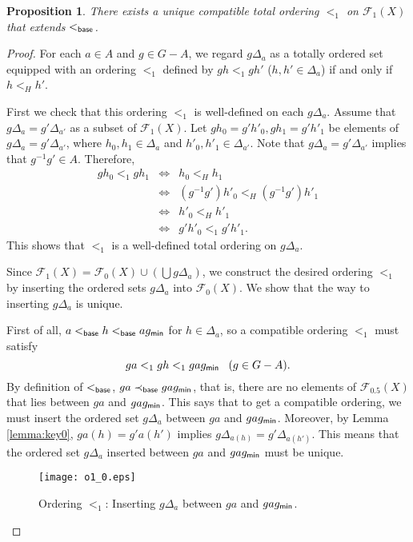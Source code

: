 \documentclass[10pt]{amsart}
\newtheorem{proposition}[theorem]{Proposition}
\numberwithin{equation}{section}
\begin{document}
\begin{proposition}
\label{prop:extbto1}
There exists a unique compatible total ordering $<_{1}$ on ${\mathcal{F}}_{1}(X)$ that extends $<_{\sf base}$.
\end{proposition}
\begin{proof}

For each $a \in A$ and $g\in G-A$, we regard $g\Delta_{a}$ as a totally ordered set equipped with an ordering $<_{1}$ defined by $gh <_{1} gh'$ ($h,h' \in \Delta_{a}$) if and only if $h <_{H} h'$. 

First we check that this ordering $<_{1}$ is well-defined on each $g\Delta_{a}$.  Assume that $g\Delta_{a} = g' \Delta_{a'}$ as a subset of ${\mathcal{F}}_{1}(X)$. Let $gh_{0}= g'h'_{0}, gh_{1}=g'h'_{1}$ be elements of $g\Delta_{a} = g' \Delta_{a'}$, where $h_{0},h_{1} \in \Delta_{a}$ and $h'_{0}, h'_{1} \in \Delta_{a'}$.
Note that $g\Delta_{a} = g' \Delta_{a'}$ implies that $g^{-1}g' \in A$. Therefore, 
\begin{eqnarray*}
gh_{0}<_{1} gh_{1} & \iff & h_{0}<_{H} h_{1} \\
& \iff & (g^{-1}g')h'_{0} <_{H} (g^{-1}g')h'_{1} \\
& \iff & h'_{0} <_{H} h'_{1}\\
& \iff & g'h'_{0} <_{1} g'h'_{1}.
\end{eqnarray*}
This shows that $<_{1}$ is a well-defined total ordering on $g\Delta_{a}$.

Since ${\mathcal{F}}_{1}(X) = {\mathcal{F}}_{0}(X) \cup \left(\bigcup g \Delta_{a} \right)$, we construct the desired ordering $<_{1}$ by inserting the ordered sets $g\Delta_{a}$ into ${\mathcal{F}}_{0}(X)$. We show that the way to inserting $g\Delta_{a}$ is unique. 

First of all, $a <_{\sf base} h <_{\sf base} ag_{\sf min}$ for $h \in \Delta_{a}$, so a compatible ordering $<_{1}$ must satisfy 
\[ ga <_{1} gh <_{1} gag_{\sf min}  \;\;\; (g \in G-A).\]
By definition of $<_{\sf base}$, $ga \prec_{\sf base} gag_{\sf min}$, that is, there are no elements of ${\mathcal{F}}_{0.5}(X)$ that lies between $ga$ and $gag_{\sf min}$.
This says that to get a compatible ordering, we must insert the ordered set $g\Delta_{a}$ between $ga$ and $gag_{\sf min}$. Moreover, by Lemma \ref{lemma:key0}, $ga(h) = g'a(h')$ implies $g \Delta_{a(h)}=g'\Delta_{a(h')}$. This means that the ordered set $g\Delta_a$ inserted between $ga$ and $gag_{\sf min}$ must be unique.

\begin{figure}[htbp]
 \begin{center}
\texttt{[image: o1\_0.eps]}
\caption{Ordering $<_{1}$: Inserting $g\Delta_{a}$ between $ga$ and $gag_{\sf min}$.}
\label{fig:o1}
\end{center}
\end{figure}


\end{proof}
\end{document}
